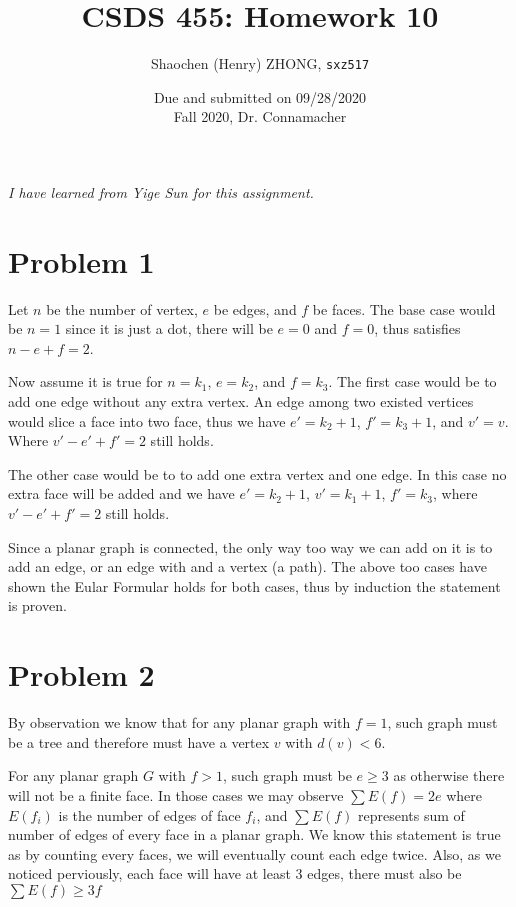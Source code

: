 \documentclass[11pt]{article}
\newcommand{\ilc}{\texttt}
\begin{document}
\title{\textbf{CSDS 455: Homework 10}}

\author{Shaochen (Henry) ZHONG, \ilc{sxz517}}
\date{Due and submitted on 09/28/2020 \\ Fall 2020, Dr. Connamacher}
\maketitle

\textit{I have learned from Yige Sun for this assignment.}

\section*{Problem 1}

Let $n$ be the number of vertex, $e$ be edges, and $f$ be faces. The base case would be $n = 1$ since it is just a dot, there will be $e = 0$ and $f = 0$, thus satisfies $n - e + f = 2$.\newline

Now assume it is true for $n = k_1$, $e = k_2$, and $f = k_3$. The first case would be to add one edge without any extra vertex. An edge among two existed vertices would slice a face into two face, thus we have $e' = k_2 + 1$, $f' = k_3 +1$, and $v' = v$. Where $v' - e' + f' = 2$ still holds.

The other case would be to to add one extra vertex and one edge. In this case no extra face will be added and we have $e' = k_2 + 1$, $v' = k_1 + 1$, $f' = k_3$, where $v' - e' + f' = 2$ still holds.

Since a planar graph is connected, the only way too way we can add on it is to add an edge, or an edge with and a vertex (a path). The above too cases have shown the Eular Formular holds for both cases, thus by induction the statement is proven.

\section*{Problem 2}

By observation we know that for any planar graph with $f = 1$, such graph must be a tree and therefore must have a vertex $v$ with $d(v) < 6$.\newline

For any planar graph $G$ with $f > 1$, such graph must be $e \geq 3$ as otherwise there will not be a finite face. In those cases we may observe $\sum E(f) = 2e$ where $E(f_i)$ is the number of edges of face $f_i$, and $\sum E(f)$ represents sum of number of edges of every face in a planar graph. We know this statement is true as by counting every faces, we will eventually count each edge twice. Also, as we noticed perviously, each face will have at least 3 edges, there must also be $\sum E(f) \geq 3f$\newline
\end{document}
